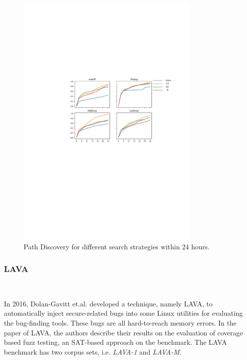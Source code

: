 \begin{figure}
\centering
\includegraphics[width=0.8\textwidth]{figures/path-time-detail.pdf} 
\caption{Path Discovery for different search strategies within 24 hours.}\label{path-detail}
\end{figure}

\subsubsection{LAVA}~\par
\vskip0.5mm
\noindent In 2016, Dolan-Gavitt et.al. developed a technique, namely LAVA, to automatically inject secure-related bugs into some Linux utilities for evaluating the bug-finding tools. These bugs are all hard-to-reach memory errors. In the paper of LAVA, the authors describe their results on the evaluation of coverage based fuzz testing, an SAT-based approach on the benchmark. The LAVA benchmark has two corpus sets, i.e. \textit{LAVA-1} and \textit{LAVA-M}.

